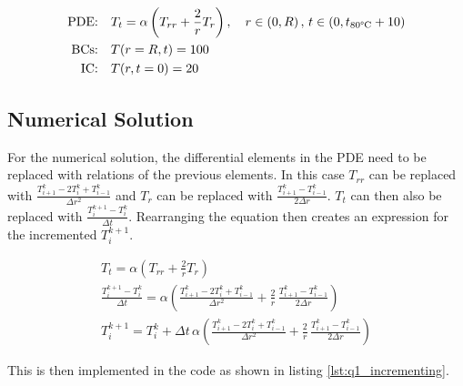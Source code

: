 \documentclass[12pt]{article}
\begin{document}
\begin{equation}
    \label{eqn:q1_pde}
    \begin{aligned}
        \text{PDE:} & \quad T_t = \alpha \left( T_{rr} + \frac{2}{r} T_r \right), \quad r \in \left(0, R\right), \, t \in \left(0, t_{\text{80\textdegree C}} + 10 \right) \\
        \text{BCs:} & \quad T(r=R, t) = 100 \\
        \text{IC:}  & \quad T(r, t=0) = 20 \\
    \end{aligned}
\end{equation}

\subsection{Numerical Solution}

For the numerical solution, the differential elements in the PDE need to be replaced with relations of the previous elements. In this case $T_{rr}$ can be replaced with $\frac{T_{i+1}^k - 2 T_i^k + T_{i-1}^k}{\Delta r^2}$ and $T_r$ can be replaced with $\frac{T_{i+1}^k - T_{i-1}^k}{2 \Delta r}$. $T_t$ can then also be replaced with $\frac{T_i^{k+1} - T_i^k}{\Delta t}$. Rearranging the equation then creates an expression for the incremented $T_i^{k+1}$.

\begin{equation}
    \label{eqn:q1_numerical_soln}
    \begin{gathered}
        T_t = \alpha \left( T_{rr} + \frac{2}{r} T_r \right) \\
        \frac{T_i^{k+1} - T_i^k}{\Delta t} = \alpha \left( \frac{T_{i+1}^k - 2 T_i^k + T_{i-1}^k}{\Delta r^2} + \frac{2}{r} \, \frac{T_{i+1}^k - T_{i-1}^k}{2\Delta r} \right) \\
        T_i^{k+1} = T_i^k + \Delta t \, \alpha \left( \frac{T_{i+1}^k - 2 T_i^k + T_{i-1}^k}{\Delta r^2} + \frac{2}{r} \, \frac{T_{i+1}^k - T_{i-1}^k}{2\Delta r} \right)
    \end{gathered}
\end{equation}

\noindent This is then implemented in the code as shown in listing \ref{lst:q1_incrementing}.


                 
\end{document}
